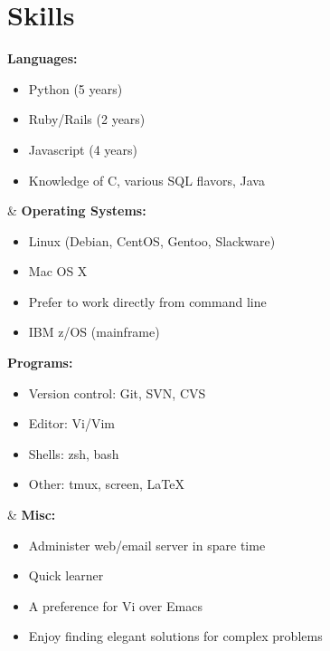 
\section{Skills}
\ifskillsGrid


\begin{ncolumn}{2}
  {\bf Languages:}
  \begin{itemize}
  \item Python (5 years)
  \item Ruby/Rails (2 years)
  \item Javascript (4 years)
  \item Knowledge of C, various SQL flavors, Java
  \end{itemize}
&
  {\bf Operating Systems:}
  \begin{itemize}
  \item Linux (Debian, CentOS, Gentoo, Slackware)
  \item Mac OS X
  \item Prefer to work directly from command line
  \item IBM z/OS (mainframe)
  \end{itemize}
\end{ncolumn}

\begin{ncolumn}{2}
  {\bf Programs:}
  \begin{itemize}
  \item Version control: Git, SVN, CVS
  \item Editor: Vi/Vim
  \item Shells: zsh, bash
  \item Other: tmux, screen, \LaTeX
  \end{itemize}
&
  {\bf Misc:}
  \begin{itemize}
  \item Administer web/email server in spare time
  \item Quick learner
  \item A preference for Vi over Emacs
  \item Enjoy finding elegant solutions for complex problems
  \end{itemize}
\end{ncolumn}


